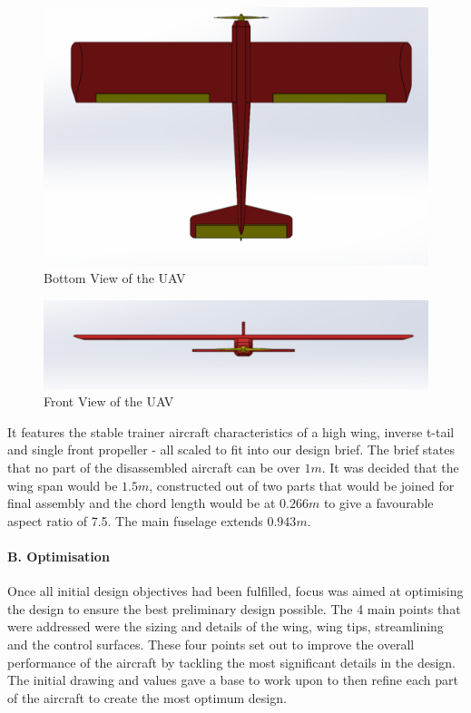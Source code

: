 \documentclass[12pt]{article}
\begin{document}
\begin{figure}[h!]
    \includegraphics[width=14.5cm]{bottom.png}
    \caption{Bottom View of the UAV}
\end{figure}

\begin{figure}[h!]
    \includegraphics[width=14.5cm]{front.png}
    \caption{Front View of the UAV}
\end{figure}

\noindent It features the stable trainer aircraft characteristics of a high wing, inverse t-tail and single front propeller - all scaled to fit into our design brief. The brief states that no part of the disassembled aircraft can be over $1m$. It was decided that the wing span would be $1.5 m$, constructed out of two parts that would be joined for final assembly and the chord length would be at $0.266    m$ to give a favourable aspect ratio of 7.5. The main fuselage extends $0.943m$. \\

\paragraph{B. Optimisation} Once all initial design objectives had been fulfilled, focus was aimed at optimising the design to ensure the best preliminary design possible. The 4 main points that were addressed were the sizing and details of the wing, wing tips, streamlining and the control surfaces. These four points set out to improve the overall performance of the aircraft by tackling the most significant details in the design. The initial drawing and values gave a base to work upon to then refine each part of the aircraft to create the most optimum design. \\
\end{document}
